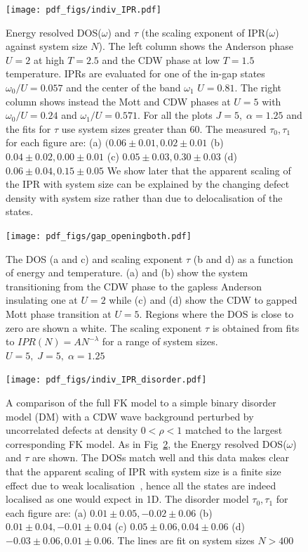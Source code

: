 \begin{figure}
\hypertarget{fig:indiv_IPR}{%
\centering
\texttt{[image: pdf\_figs/indiv\_IPR.pdf]}
\caption{Energy resolved DOS(\(\omega\)) and \(\tau\) (the scaling exponent of IPR(\(\omega\)) against system size \(N\)). The left column shows the Anderson phase \(U = 2\) at high \(T = 2.5\) and the CDW phase at low \(T = 1.5\) temperature. IPRs are evaluated for one of the in-gap states \(\omega_0/U = 0.057\) and the center of the band \(\omega_1\) \(U = 0.81\). The right column shows instead the Mott and CDW phases at \(U = 5\) with \(\omega_0/U = 0.24\) and \(\omega_1/U = 0.571\). For all the plots \(J = 5,\;\alpha = 1.25\) and the fits for \(\tau\) use system sizes greater than 60. The measured \(\tau_0,\tau_1\) for each figure are: (a) \((0.06\pm0.01, 0.02\pm0.01\) (b) \(0.04\pm0.02, 0.00\pm0.01\) (c) \(0.05\pm0.03, 0.30\pm0.03\) (d) \(0.06\pm0.04, 0.15\pm0.05\) We show later that the apparent scaling of the IPR with system size can be explained by the changing defect density with system size rather than due to delocalisation of the states.}\label{fig:indiv_IPR}
}
\end{figure}

\begin{figure}
\hypertarget{fig:band_opening}{%
\centering
\texttt{[image: pdf\_figs/gap\_openingboth.pdf]}
\caption{The {DOS} (a and c) and scaling exponent \(\tau\) (b and d) as a function of energy and temperature. (a) and (b) show the system transitioning from the CDW phase to the gapless Anderson insulating one at \(U=2\) while (c) and (d) show the CDW to gapped Mott phase transition at \(U=5\). Regions where the DOS is close to zero are shown a white. The scaling exponent \(\tau\) is obtained from fits to \(IPR(N) = A N^{-\lambda}\) for a range of system sizes. \(U = 5,\;J = 5,\;\alpha = 1.25\)}\label{fig:band_opening}
}
\end{figure}

\begin{figure}
\hypertarget{fig:indiv_IPR_disorder}{%
\centering
\texttt{[image: pdf\_figs/indiv\_IPR\_disorder.pdf]}
\caption{A comparison of the full {FK} model to a simple binary disorder model (DM) with a CDW wave background perturbed by uncorrelated defects at density \(0 < \rho < 1\) matched to the largest corresponding FK model. As in Fig~\protect\hyperlink{fig:indiv_IPR}{2}, the Energy resolved DOS(\(\omega\)) and \(\tau\) are shown. The DOSs match well and this data makes clear that the apparent scaling of IPR with system size is a finite size effect due to weak localisation~\autocite{antipovInteractionTunedAndersonMott2016}, hence all the states are indeed localised as one would expect in 1D. The disorder model \(\tau_0,\tau_1\) for each figure are: (a) \(0.01\pm0.05, -0.02\pm0.06\) (b) \(0.01\pm0.04, -0.01\pm0.04\) (c) \(0.05\pm0.06, 0.04\pm0.06\) (d) \(-0.03\pm0.06, 0.01\pm0.06\). The lines are fit on system sizes \(N > 400\)}\label{fig:indiv_IPR_disorder}
}
\end{figure}

